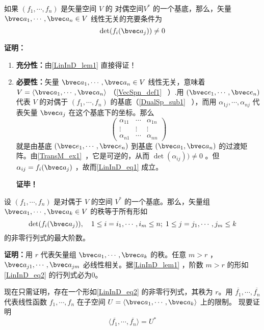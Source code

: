\begin{lemma}{}\label{LinInD_lem2}
如果 $(f_1,\cdots,f_n)$ 是矢量空间 $V$ 的 对偶空间$V^*$ 的一个基底，那么，矢量 $\bvec a_1,\cdots,\bvec a_n\in V$ 线性无关的充要条件为
\begin{equation}\label{LinInD_eq1}
\det(f_i(\bvec a_j))\neq 0
\end{equation}
\end{lemma}
\textbf{证明：} \begin{enumerate}
\item \textbf{充分性：}由\autoref{LinInD_lem1} 直接得证！
\item \textbf{必要性：}矢量 $\bvec a_1,\cdots,\bvec a_n\in V$ 线性无关，意味着 $V=\langle\bvec a_1,\cdots,\bvec a_n\rangle$ （\autoref{VecSpn_def1}~ ）.用 $(\bvec e_1,\cdots,\bvec e_n)$ 代表 $V$ 的对偶于 $(f_1,\cdots,f_n)$ 的基底（\autoref{DualSp_sub1}~ ），而用 $\alpha_{1j},\cdots,\alpha_{nj}$ 代表矢量 $\bvec a_j$ 在这个基底下的坐标。那么
\begin{equation}
\begin{pmatrix}
\alpha_{11}&\cdots&\alpha_{1n}\\
\vdots&\vdots&\vdots\\
\alpha_{n1}&\cdots&\alpha_{nn}
\end{pmatrix}
\end{equation}
就是由基底 $(\bvec e_1,\cdots,\bvec e_n)$ 到基底 $(\bvec a_1,\bvec a_n)$ 的过渡矩阵。由\autoref{TransM_ex1}~，它是可逆的，从而 $\det(\alpha_{ij}))\neq0$ 。但 $\alpha_{ij}=f_i(\bvec a_j)$ ，故而\autoref{LinInD_eq1} 成立。

\textbf{证毕！} 
\end{enumerate}
\begin{theorem}{}
设 $(f_1,\cdots,f_n)$ 是对偶于 $V$ 的空间 $V^*$ 的一个基底。那么，矢量组 $\bvec a_1,\cdots,\bvec a_k\in V$ 的秩等于所有形如
\begin{equation}\label{LinInD_eq2}
\det(f_i(\bvec a_j)),\quad 1\leq i=i_1,\cdots ,i_m\leq n;\;1\leq j=j_1,\cdots,j_m\leq k
\end{equation}
的非零行列式的最大阶数。
\end{theorem}
\textbf{证明：}用 $r$ 代表矢量组 $\bvec a_1,\cdots,\bvec a_k$ 的秩。任意 $m>r$ ，$\bvec a_{j1},\cdots,\bvec a_{jm}$ 必线性相关。据\autoref{LinInD_lem1} ，阶数 $m>r$ 的形如\autoref{LinInD_eq2} 的行列式必为0。

现在只需证明，存在一个形如\autoref{LinInD_eq2} 的非零行列式，其秩为 $r$。用 $\overline{f_1},\cdots,\overline{f_n}$ 代表线性函数 $f_1,\cdots,f_n$ 在子空间 $U=\langle\bvec a_1,\cdots,\bvec a_k\rangle$ 上的限制。
现要证明
\begin{equation}\label{LinInD_eq3}
\langle\overline{f_1},\cdots,\overline{f_n}\rangle=U^*
\end{equation}


